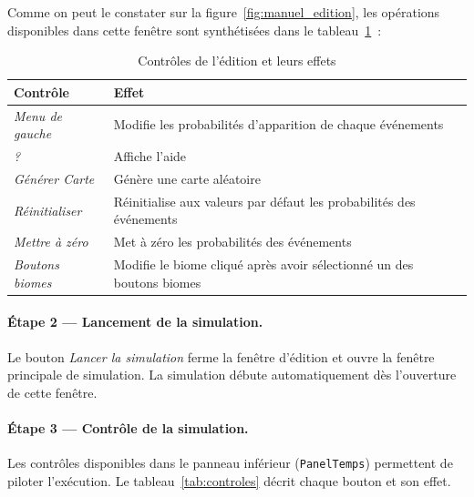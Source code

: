 Comme on peut le constater sur la figure~\ref{fig:manuel_edition}, les opérations
disponibles dans cette fenêtre sont synthétisées dans le tableau~\ref{tab:controles_edition}~:

\begin{table}[htbp]
  \centering
  \begin{tabular}{l>{\raggedright\arraybackslash}p{9cm}}
    \toprule
    \textbf{Contrôle} & \textbf{Effet} \\
    \midrule
    \textit{Menu de gauche} & Modifie les probabilités d'apparition de chaque événements\\
    \textit{?} & Affiche l'aide\\
    \textit{Générer Carte} & Génère une carte aléatoire \\
    \textit{Réinitialiser} & Réinitialise aux valeurs par défaut les probabilités des événements \\
    \textit{Mettre à zéro} & Met à zéro les probabilités des événements \\
    \textit{Boutons biomes} & Modifie le biome cliqué après avoir sélectionné un des boutons biomes\\
    \bottomrule
  \end{tabular}
  \caption{Contrôles de l'édition et leurs effets}
  \label{tab:controles_edition}
\end{table}

\paragraph{Étape 2 — Lancement de la simulation.}
Le bouton \textit{Lancer la simulation} ferme la fenêtre d'édition et ouvre la
fenêtre principale de simulation. La simulation débute automatiquement dès
l'ouverture de cette fenêtre.

\paragraph{Étape 3 — Contrôle de la simulation.}
Les contrôles disponibles dans le panneau inférieur (\texttt{PanelTemps})
permettent de piloter l'exécution. Le tableau~\ref{tab:controles} décrit chaque
bouton et son effet.

